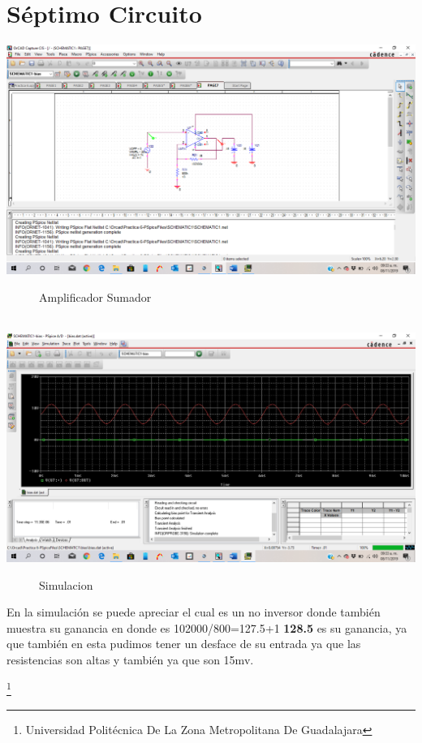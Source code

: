 \documentclass[10pt,a4paper]{article}
\begin{document}
\section{Séptimo Circuito}
\begin{center}
 \includegraphics[scale=0.3]{13.png}
 \begin{figure}[hbtp]
 \caption{Amplificador Sumador}
 \centering
 \end{figure}\\
  \includegraphics[scale=0.3]{14.png}
 \begin{figure}[hbtp]
 \caption{Simulacion}
 \centering
 \end{figure} 
\end{center}

En la simulación se puede apreciar el cual es un no inversor donde también muestra su ganancia en donde es 102000/800=127.5+1 \textbf{128.5} es su ganancia, ya que también en esta pudimos tener un desface de su entrada ya que las resistencias son altas y también ya que son 15mv.


\footnote{Universidad Politécnica De La Zona Metropolitana De Guadalajara} 
\end{document}
